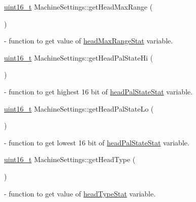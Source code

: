 \mbox{\label{classMachineSettings_a77384a60e0ded049aa4c4a5c0b5e193b}} 
{\footnotesize\ttfamily \mbox{\hyperlink{settings_8h_a017dd44e68049ffdd31500a8cd01ba68}{uint16\+\_\+t}} Machine\+Settings\+::\texorpdfstring{get\+Head\+Max\+Range}{getHeadMaxRange} (\begin{DoxyParamCaption}{ }\end{DoxyParamCaption}){\ttfamily [static]}} - function to get value of \hyperlink{classMachineSettings_ab223e2bea0de3ab0c85452d124d2b434}{head\+Max\+Range\+Stat} variable.

\mbox{\label{classMachineSettings_aca60698179b068072b45bea26c919da9}} 
{\footnotesize\ttfamily \mbox{\hyperlink{settings_8h_a017dd44e68049ffdd31500a8cd01ba68}{uint16\+\_\+t}} Machine\+Settings\+::\texorpdfstring{get\+Head\+Pal\+State\+Hi}{getHeadPalStateHi} (\begin{DoxyParamCaption}{ }\end{DoxyParamCaption}){\ttfamily [static]}} - function to get highest 16 bit of \hyperlink{classMachineSettings_a1543a985ca7e47a2853dcfef75227a5a}{head\+Pal\+State\+Stat} variable.

\mbox{\label{classMachineSettings_a8b0acb6f0ad4a795c8ea18338c035e14}} 
{\footnotesize\ttfamily \mbox{\hyperlink{settings_8h_a017dd44e68049ffdd31500a8cd01ba68}{uint16\+\_\+t}} Machine\+Settings\+::\texorpdfstring{get\+Head\+Pal\+State\+Lo}{getHeadPalStateLo} (\begin{DoxyParamCaption}{ }\end{DoxyParamCaption}){\ttfamily [static]}} - function to get lowest 16 bit of \hyperlink{classMachineSettings_a1543a985ca7e47a2853dcfef75227a5a}{head\+Pal\+State\+Stat} variable.

\mbox{\label{classMachineSettings_a806a1562aea709bb99a614485ee5401e}} 
{\footnotesize\ttfamily \mbox{\hyperlink{settings_8h_a017dd44e68049ffdd31500a8cd01ba68}{uint16\+\_\+t}} Machine\+Settings\+::\texorpdfstring{get\+Head\+Type}{getHeadType} (\begin{DoxyParamCaption}{ }\end{DoxyParamCaption}){\ttfamily [static]}} - function to get value of \hyperlink{classMachineSettings_a1cfa5a234b9cbce7c1e1b881992e1d2e}{head\+Type\+Stat} variable.

